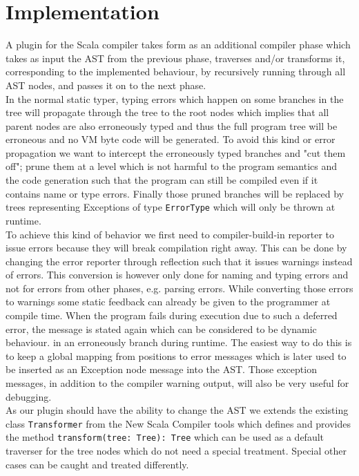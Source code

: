 \section{Implementation}

A plugin for the Scala compiler takes form as an additional compiler phase which takes as input the AST from the previous phase, traverses and/or transforms it, corresponding to the implemented behaviour, by recursively running through all AST nodes, and passes it on to the next phase.
\\
In the normal static typer, typing errors which happen on some branches in the tree will propagate through the tree to the root nodes which implies that all parent nodes are also erroneously typed and thus the full program tree will be erroneous and no VM byte code will be generated. To avoid this kind or error propagation we want to intercept the erroneously typed branches and "cut them off"; prune them at a level which is not harmful to the program semantics and the code generation such that the program can still be compiled even if it contains name or type errors. Finally those pruned
branches will be replaced by trees representing Exceptions of type \texttt{ErrorType} which will only be thrown at runtime.
\\
To achieve  this kind of behavior we first need to compiler-build-in reporter to issue errors because they will break compilation right away. This can be done by changing the error reporter through reflection such that it issues warnings instead of errors. This conversion is however only done for naming and typing errors and not for errors from other phases, e.g. parsing errors. While converting those errors to warnings some static feedback can already be given to the programmer at compile time. When the program fails during execution due to such a deferred error, the message is stated again which can be considered to be dynamic behaviour.
in an erroneously branch during runtime. The easiest way to do this is to keep a global mapping from positions to error messages which is later used to be inserted as an Exception node message into the AST. Those exception messages, in addition to the compiler warning output, will also be very useful for debugging.
\\
As our plugin should have the ability to change the AST we extends the existing class \texttt{Transformer} from the New Scala Compiler tools which defines and provides the method \texttt{transform(tree: Tree): Tree} which can be used as a default traverser for the tree nodes which do not need a special treatment. Special other cases can be caught and treated differently.
